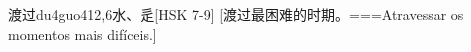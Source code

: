 \begin{EntryWithPhonetic}{渡过}{du4guo4}{12,6}{⽔、⾡}[HSK 7-9]
  [渡过最困难的时期。===Atravessar os momentos mais difíceis.]
\end{EntryWithPhonetic}
